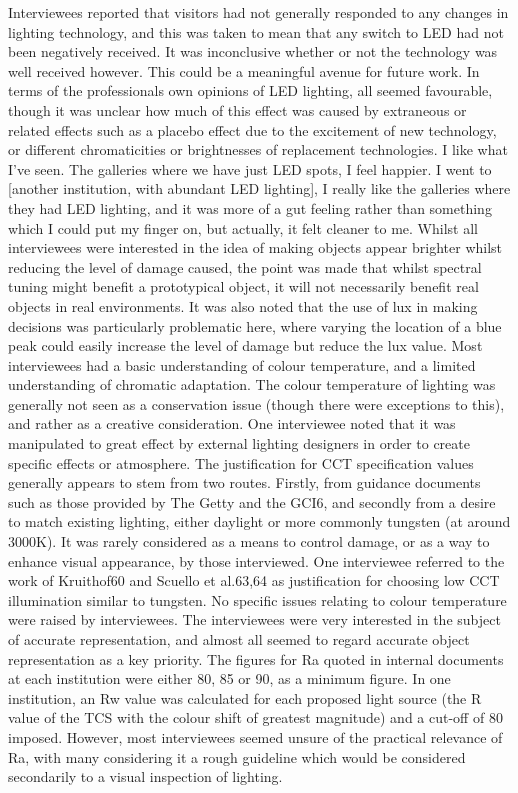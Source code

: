 Interviewees reported that visitors had not generally responded to any changes in lighting technology, and this was taken to mean that any switch to LED had not been negatively received. It was inconclusive whether or not the technology was well received however. This could be a meaningful avenue for future work. In terms of the professionals own opinions of LED lighting, all seemed favourable, though it was unclear how much of this effect was caused by extraneous or related effects such as a placebo effect due to the excitement of new technology, or different chromaticities or brightnesses of replacement technologies.  
I like what I've seen. The galleries where we have just LED spots, I feel happier. I went to [another institution, with abundant LED lighting], I really like the galleries where they had LED lighting, and it was more of a gut feeling rather than something which I could put my finger on, but actually, it felt cleaner to me.
Whilst all interviewees were interested in the idea of making objects appear brighter whilst reducing the level of damage caused, the point was made that whilst spectral tuning might benefit a prototypical object, it will not necessarily benefit real objects in real environments. It was also noted that the use of lux in making decisions was particularly problematic here, where varying the location of a blue peak could easily increase the level of damage but reduce the lux value.
Most interviewees had a basic understanding of colour temperature, and a limited understanding of chromatic adaptation. The colour temperature of lighting was generally not seen as a conservation issue (though there were exceptions to this), and rather as a creative consideration. One interviewee noted that it was manipulated to great effect by external lighting designers in order to create specific effects or atmosphere.
The justification for \gls{CCT} specification values generally appears to stem from two routes. Firstly, from guidance documents such as those provided by The Getty and the GCI6, and secondly from a desire to match existing lighting, either daylight or more commonly tungsten (at around 3000K). It was rarely considered as a means to control damage, or as a way to enhance visual appearance, by those interviewed. One interviewee referred to the work of Kruithof60 and Scuello et al.63,64 as justification for choosing low \gls{CCT} illumination similar to tungsten. No specific issues relating to colour temperature were raised by interviewees.
The interviewees were very interested in the subject of accurate representation, and almost all seemed to regard accurate object representation as a key priority. The figures for Ra quoted in internal documents at each institution were either 80, 85 or 90, as a minimum figure. In one institution, an Rw value was calculated for each proposed light source (the R value of the TCS with the colour shift of greatest magnitude) and a cut-off of 80 imposed. However, most interviewees seemed unsure of the practical relevance of Ra, with many considering it a rough guideline which would be considered secondarily to a visual inspection of lighting.
